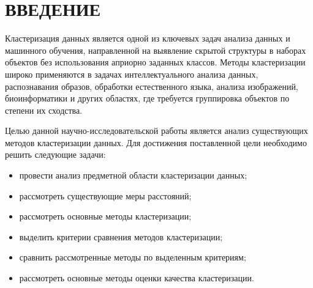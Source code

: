 \chapter*{ВВЕДЕНИЕ}


Кластеризация данных является одной из ключевых задач анализа данных и машинного обучения, направленной на выявление скрытой структуры в наборах объектов без использования априорно заданных классов. Методы кластеризации широко применяются в задачах интеллектуального анализа данных, распознавания образов, обработки естественного языка, анализа изображений, биоинформатики и других областях, где требуется группировка объектов по степени их сходства.

Целью данной научно-исследовательской работы является анализ существующих методов кластеризации данных. Для достижения поставленной цели необходимо решить следующие задачи:
\begin{itemize}
    \item[---] провести анализ предметной области кластеризации данных;
    \item[---] рассмотреть существующие меры расстояний;
    \item[---] рассмотреть основные методы кластеризации;
    \item[---] выделить критерии сравнения методов кластеризации;
    \item[---] сравнить рассмотренные методы по выделенным критериям;
    \item[---] рассмотреть основные методы оценки качества кластеризации.
\end{itemize}
